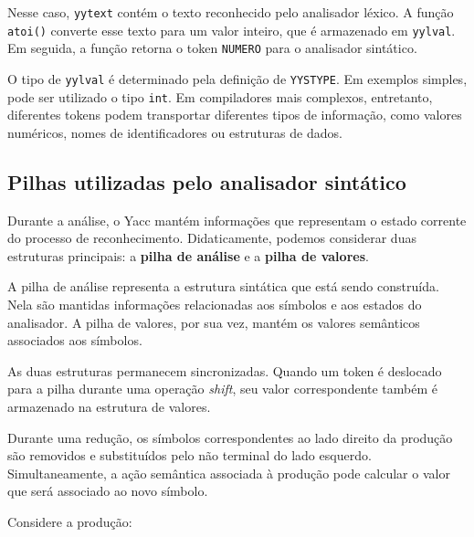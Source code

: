 \documentclass[
  brazilian,
  letterpaper,
]{book}
\newenvironment{Shaded}{\begin{snugshade}}{\end{snugshade}}
\newcommand{\DecValTok}[1]{\textcolor[rgb]{0.68,0.00,0.00}{#1}}
\newcommand{\NormalTok}[1]{\textcolor[rgb]{0.00,0.23,0.31}{#1}}
\newcommand{\OperatorTok}[1]{\textcolor[rgb]{0.37,0.37,0.37}{#1}}
\theoremstyle{plain}
\theoremstyle{definition}
\theoremstyle{remark}
\begin{document}
Nesse caso, \texttt{yytext} contém o texto reconhecido pelo analisador
léxico. A função \texttt{atoi()} converte esse texto para um valor
inteiro, que é armazenado em \texttt{yylval}. Em seguida, a função
retorna o token \texttt{NUMERO} para o analisador sintático.

O tipo de \texttt{yylval} é determinado pela definição de
\texttt{YYSTYPE}. Em exemplos simples, pode ser utilizado o tipo
\texttt{int}. Em compiladores mais complexos, entretanto, diferentes
tokens podem transportar diferentes tipos de informação, como valores
numéricos, nomes de identificadores ou estruturas de dados.

\subsection{Pilhas utilizadas pelo analisador
sintático}\label{pilhas-utilizadas-pelo-analisador-sintuxe1tico}

Durante a análise, o Yacc mantém informações que representam o estado
corrente do processo de reconhecimento. Didaticamente, podemos
considerar duas estruturas principais: a \textbf{pilha de análise} e a
\textbf{pilha de valores}.

A pilha de análise representa a estrutura sintática que está sendo
construída. Nela são mantidas informações relacionadas aos símbolos e
aos estados do analisador. A pilha de valores, por sua vez, mantém os
valores semânticos associados aos símbolos.

As duas estruturas permanecem sincronizadas. Quando um token é deslocado
para a pilha durante uma operação \emph{shift}, seu valor correspondente
também é armazenado na estrutura de valores.

Durante uma redução, os símbolos correspondentes ao lado direito da
produção são removidos e substituídos pelo não terminal do lado
esquerdo. Simultaneamente, a ação semântica associada à produção pode
calcular o valor que será associado ao novo símbolo.

Considere a produção:

\begin{Shaded}
\end{Shaded}
\end{document}
